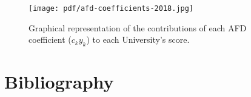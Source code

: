 \documentclass[twocolumn]{article}
\begin{document}
\begin{figure}[p]
\centering
\texttt{[image: pdf/afd-coefficients-2018.jpg]}
\caption{Graphical representation of the contributions of each AFD coefficient ($c_k y_k$) to each University's score.}
\end{figure}

\section*{Bibliography}


\end{document}
